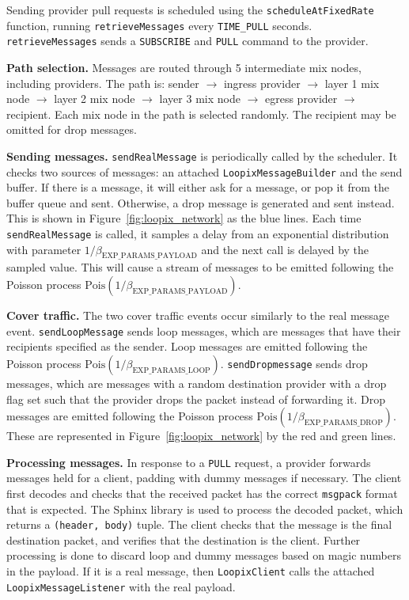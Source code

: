 \documentclass[final,dissertation.tex]{subfiles}
\begin{document}
Sending provider pull requests is scheduled using the \verb|scheduleAtFixedRate| function, running \verb|retrieveMessages| every \verb|TIME_PULL| seconds. \verb|retrieveMessages| sends a \verb|SUBSCRIBE| and \verb|PULL| command to the provider.

\textbf{Path selection.} Messages are routed through 5 intermediate mix nodes, including providers. The path is: sender $\rightarrow$ ingress provider $\rightarrow$ layer 1 mix node $\rightarrow$ layer 2 mix node $\rightarrow$ layer 3 mix node $\rightarrow$ egress provider $\rightarrow$ recipient. Each mix node in the path is selected randomly. The recipient may be omitted for drop messages.

\textbf{Sending messages.} \verb|sendRealMessage| is periodically called by the scheduler. It checks two sources of messages: an attached \verb|LoopixMessageBuilder| and the send buffer. If there is a message, it will either ask for a message, or pop it from the buffer queue and sent. Otherwise, a drop message is generated and sent instead. This is shown in Figure~\ref{fig:loopix_network} as the blue lines. Each time \verb|sendRealMessage| is called, it samples a delay from an exponential distribution with parameter $1/\beta_\text{EXP\_PARAMS\_PAYLOAD}$ and the next call is delayed by the sampled value. This will cause a stream of messages to be emitted following the Poisson process $\text{Pois}(1/\beta_\text{EXP\_PARAMS\_PAYLOAD})$.

\textbf{Cover traffic.} The two cover traffic events occur similarly to the real message event. \verb|sendLoopMessage| sends loop messages, which are messages that have their recipients specified as the sender. Loop messages are emitted following the Poisson process $\text{Pois}(1/\beta_\text{EXP\_PARAMS\_LOOP})$. \verb|sendDropmessage| sends drop messages, which are messages with a random destination provider with a drop flag set such that the provider drops the packet instead of forwarding it. Drop messages are emitted following the Poisson process $\text{Pois}(1/\beta_\text{EXP\_PARAMS\_DROP})$. These are represented in Figure~\ref{fig:loopix_network} by the red and green lines.

\textbf{Processing messages.} In response to a \verb|PULL| request, a provider forwards messages held for a client, padding with dummy messages if necessary. The client first decodes and checks that the received packet has the correct \verb|msgpack| format that is expected. The Sphinx library is used to process the decoded packet, which returns a \verb|(header, body)| tuple. The client checks that the message is the final destination packet, and verifies that the destination is the client. Further processing is done to discard loop and dummy messages based on magic numbers in the payload. If it is a real message, then \verb|LoopixClient| calls the attached \verb|LoopixMessageListener| with the real payload.
\end{document}
